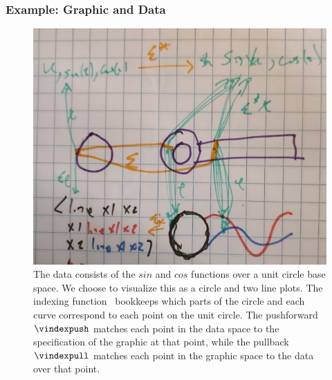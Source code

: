 \documentclass[10pt,journal,compsoc]{IEEEtran}
\theoremstyle{definition}
\theoremstyle{remark}
\begin{document}
\subsubsection{Example: Graphic and Data}
\begin{figure}[h!]
  \includegraphics*[width=1\columnwidth]{xi_sin.png}
  \caption{The data consists of the $sin$ and $cos$ functions over a unit circle base space. We choose to visualize this as a circle and two line plots. The indexing function \vindex\ bookkeeps which parts of the circle and each curve correspond to each point on the unit circle. The pushforward $\vindexpush$ matches each point in the data space to the specification of the graphic at that point, while the pullback $\vindexpull$ matches each point in the graphic space to the data over that point. \label{fig:atct:morphisms:sheaf}} 
\end{figure}
\end{document}
